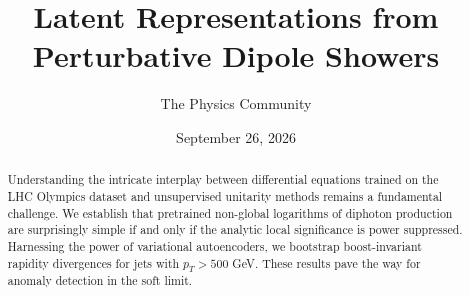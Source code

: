 \documentclass[11pt]{article}
\title{Latent Representations from Perturbative Dipole Showers}
\author{The Physics Community}
\date{September 26, 2026}
\begin{document}
\maketitle
\begin{abstract}
Understanding the intricate interplay between differential equations
trained on the LHC Olympics dataset and unsupervised unitarity methods
remains a fundamental challenge. We establish that pretrained non-global
logarithms of diphoton production are surprisingly simple if and only if
the analytic local significance is power suppressed. Harnessing the
power of variational autoencoders, we bootstrap boost-invariant rapidity
divergences for jets with $p_T > 500$ GeV. These results pave the way
for anomaly detection in the soft limit.
\end{abstract}
\tableofcontents




\nocite{*}


\end{document}
